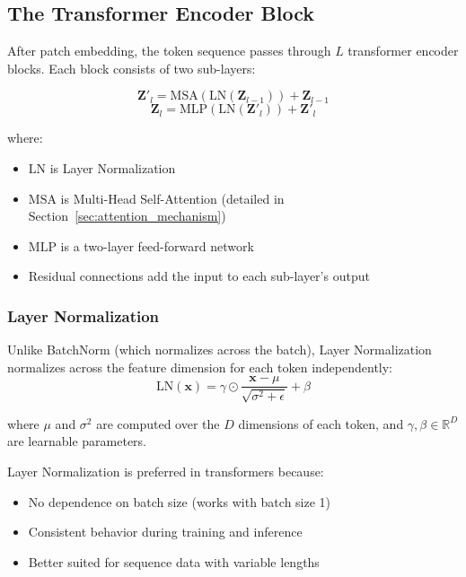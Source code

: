 \subsection{The Transformer Encoder Block}

After patch embedding, the token sequence passes through $L$ transformer encoder blocks. Each block consists of two sub-layers:

\begin{equation}
\mathbf{Z}'_l = \text{MSA}(\text{LN}(\mathbf{Z}_{l-1})) + \mathbf{Z}_{l-1}
\label{eq:transformer_msa}
\end{equation}
\begin{equation}
\mathbf{Z}_l = \text{MLP}(\text{LN}(\mathbf{Z}'_l)) + \mathbf{Z}'_l
\label{eq:transformer_mlp}
\end{equation}

where:
\begin{itemize}
    \item $\text{LN}$ is Layer Normalization
    \item $\text{MSA}$ is Multi-Head Self-Attention (detailed in Section~\ref{sec:attention_mechanism})
    \item $\text{MLP}$ is a two-layer feed-forward network
    \item Residual connections add the input to each sub-layer's output
\end{itemize}

\subsubsection{Layer Normalization}

Unlike BatchNorm (which normalizes across the batch), Layer Normalization normalizes across the feature dimension for each token independently:
\begin{equation}
\text{LN}(\mathbf{x}) = \gamma \odot \frac{\mathbf{x} - \mu}{\sqrt{\sigma^2 + \epsilon}} + \beta
\label{eq:layer_norm}
\end{equation}

where $\mu$ and $\sigma^2$ are computed over the $D$ dimensions of each token, and $\gamma, \beta \in \mathbb{R}^D$ are learnable parameters.

Layer Normalization is preferred in transformers because:
\begin{itemize}
    \item No dependence on batch size (works with batch size 1)
    \item Consistent behavior during training and inference
    \item Better suited for sequence data with variable lengths
\end{itemize}

